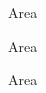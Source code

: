 \documentclass[a4paper]{article}
\begin{document}
\printGenericVSLHeader
\begin{center}
\begin{vsltext}{3cm}{3.5cm}

Area \AreaA

\vspace{1cm}

Area \AreaB

\vspace{1cm}

Area \AreaC

\end{vsltext}

\end{center}
\end{document}
